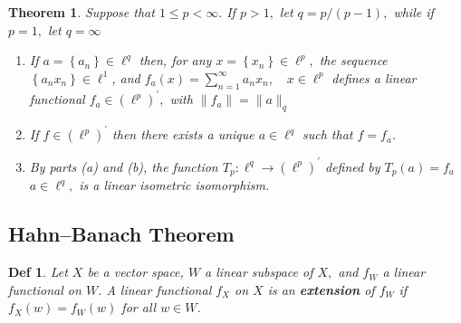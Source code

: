 \documentclass[10pt]{paper}
\newtheorem{theorem}{Theorem}[section]
\newtheorem{definition}{Def}[section]
\begin{document}
\begin{theorem}
    Suppose that $1 \leq p<\infty .$ If $p>1,$ let $q=p /(p-1),$ while if $p=1,$ let $q=\infty$
    \begin{enumerate}
        \item If $a=\left\{a_{n}\right\} \in \ell^{q}$ then, for any $x=\left\{x_{n}\right\} \in \ell^{p},$ the sequence $\left\{a_{n} x_{n}\right\} \in \ell^{1}$, and $f_{a}(x)=\sum_{n=1}^{\infty} a_{n} x_{n}, \quad x \in \ell^{p}$
        defines a linear functional $f_{a} \in\left(\ell^{p}\right)^{\prime},$ with $\left\|f_{a}\right\|=\|a\|_{q}$
        \item If $f \in\left(\ell^{p}\right)^{\prime}$ then there exists a unique $a \in \ell^{q}$ such that $f=f_{a}$.
        \item By parts (a) and (b), the function $T_{p}: \ell^{q} \rightarrow\left(\ell^{p}\right)^{\prime}$ defined by $T_{p}(a)=f_{a}$ $a \in \ell^{q},$ is a linear isometric isomorphism.
    \end{enumerate}
\end{theorem}

\subsection{Hahn–Banach Theorem}

\begin{definition}
    Let $X$ be a vector space, $W$ a linear subspace of $X,$ and $f_{W}$ a linear functional on $W$. A linear functional $f_{X}$ on $X$ is an \textbf{extension} of $f_{W}$ if $f_{X}(w)=f_{W}(w)$ for all $w \in W$.
\end{definition}
\end{document}
